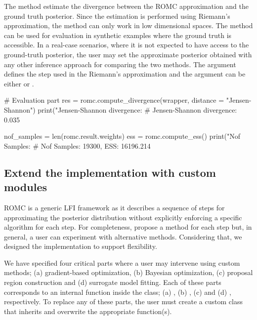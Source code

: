 \documentclass[article]{jss}
\begin{document}
\noindent
The method  estimate the divergence between the ROMC approximation
and the ground truth posterior. Since the estimation is performed
using Riemann's approximation, the method can only work in low
dimensional spaces. The method can be used for evaluation in synthetic
examples where the ground truth is accessible. In a real-case
scenarios, where it is not expected to have access to the ground-truth
posterior, the user may set the approximate posterior obtained with
any other inference approach for comparing the two methods. The
argument  defines the step used in the Riemann's
approximation and the argument  can be either
 or .

\begin{Code}
# Evaluation part
res = romc.compute_divergence(wrapper, distance = "Jensen-Shannon")
print("Jensen-Shannon divergence: %
# Jensen-Shannon divergence: 0.035

nof_samples = len(romc.result.weights)
ess = romc.compute_ess()
print("Nof Samples: %
# Nof Samples: 19300, ESS: 16196.214
\end{Code}


\subsection{Extend the implementation with custom modules}
\label{subsec:extensibility}

ROMC is a generic LFI framework as it describes a sequence of steps
for approximating the posterior distribution without explicitly
enforcing a specific algorithm for each step. For completeness,
\cite{Ikonomov2019} propose a method for each step but, in general, a
user can experiment with alternative methods. Considering that, we
designed the implementation to support flexibility.

We have specified four critical parts where a user may intervene using
custom methods; (a) gradient-based optimization, (b) Bayesian
optimization, (c) proposal region construction and (d) surrogate model
fitting. Each of these parts corresponds to an internal function
inside the  class; (a)
, (b) , (c)
 and (d) ,
respectively. To replace any of these parts, the user must create a
custom class that inherits  and overwrite the
appropriate function(s).
\end{document}

